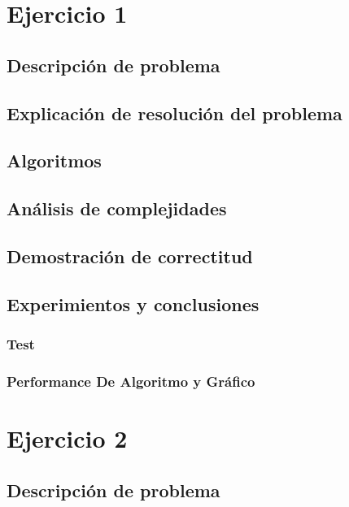\documentclass[12pt, a4paper]{article}
\begin{document}
\maketitle
\tableofcontents
\newpage

\newpage
\section{Ejercicio 1} 
\subsection{Descripci\'on de problema}

\subsection{Explicaci\'on de resoluci\'on del problema}

\subsection{Algoritmos}

\subsection{An\'alisis de complejidades}

\subsection{Demostraci\'on de correctitud}

\subsection{Experimientos y conclusiones}
\subsubsection[1.5]{Test}

\subsubsection[1.5]{Performance De Algoritmo y Gr\'afico}


\newpage
\section{Ejercicio 2} 
\subsection{Descripci\'on de problema}

\end{document}

